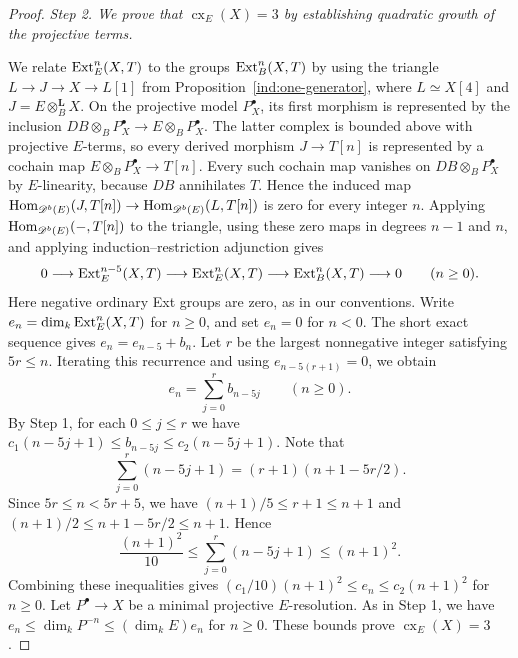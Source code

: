 \documentclass[11pt]{article}
\begin{document}
\begin{proof}
\smallskip\noindent
\emph{Step 2. We prove that $\operatorname{cx}_E(X)=3$ by establishing quadratic growth of the projective terms.}
\par\nobreak\smallskip\nobreak
\noindent
We relate ${\rm Ext}_E^n(X,T)$ to the groups ${\rm Ext}_B^n(X,T)$ by using the triangle $L\to J\to X\to L[1]$
from Proposition~\ref{ind:one-generator}, where
$L\simeq X[4]$ and $J=E\otimes_B^{\mathbf L}X$.
On the projective model $P_X^\bullet$, its first morphism is
represented by the inclusion
$DB\otimes_BP_X^\bullet\to E\otimes_BP_X^\bullet$.
The latter complex is bounded above with projective $E$-terms,
so every derived morphism $J\to T[n]$ is represented by a cochain map
$E\otimes_BP_X^\bullet\to T[n]$. Every such cochain map vanishes on
$DB\otimes_BP_X^\bullet$ by $E$-linearity, because $DB$ annihilates $T$.
Hence the induced map
${\rm Hom}_{\mathscr D^b(E)}(J,T[n])\to
{\rm Hom}_{\mathscr D^b(E)}(L,T[n])$ is zero for every integer $n$.
Applying ${\rm Hom}_{\mathscr D^b(E)}(-,T[n])$ to the triangle, using
these zero maps in degrees $n-1$ and $n$, and applying
induction--restriction adjunction gives
\[
 0\longrightarrow{\rm Ext}_E^{n-5}(X,T)
 \longrightarrow{\rm Ext}_E^n(X,T)
 \longrightarrow{\rm Ext}_B^n(X,T)\longrightarrow0
 \qquad(n\ge0).
\]
Here negative ordinary Ext groups are zero, as in our conventions.
Write $e_n=\dim_k{\rm Ext}_E^n(X,T)$ for $n\ge0$, and set $e_n=0$
for $n<0$. The short exact sequence gives $e_n=e_{n-5}+b_n$.
Let $r$ be the largest nonnegative integer satisfying $5r\le n$.
Iterating this recurrence and using $e_{n-5(r+1)}=0$, we obtain
\[
e_n=\sum_{j=0}^{r}b_{n-5j}\qquad(n\ge0).
\]
By Step 1, for each $0\le j\le r$ we have
$c_1(n-5j+1)\le b_{n-5j}\le c_2(n-5j+1)$.
Note that
\[
\sum_{j=0}^{r}(n-5j+1)=(r+1)(n+1-5r/2).
\]
Since $5r\le n<5r+5$, we have
$(n+1)/5\le r+1\le n+1$ and
$(n+1)/2\le n+1-5r/2\le n+1$. Hence
\[
\frac{(n+1)^2}{10}\le\sum_{j=0}^{r}(n-5j+1)\le(n+1)^2.
\]
Combining these inequalities gives
$(c_1/10)(n+1)^2\le e_n\le c_2(n+1)^2$ for $n\ge0$.
Let $P^\bullet\to X$ be a minimal projective $E$-resolution.
As in Step 1, we have  $e_n\le\dim_kP^{-n}\le(\dim_kE)e_n$ for $n\ge0$.
These bounds prove $\operatorname{cx}_E(X)=3$.


\end{proof}
\end{document}
